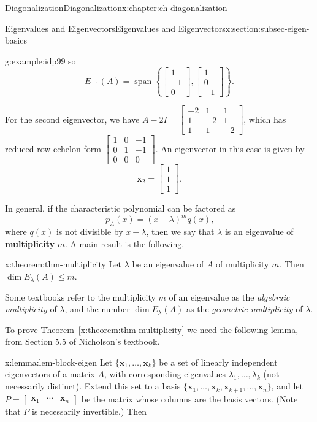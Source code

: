 \documentclass[oneside,10pt,]{book}
\newcommand{\xreffont}{\relax}
\newcommand{\terminology}[1]{\textbf{#1}}
\numberwithin{equation}{section}
\newcommand{\spn}{\operatorname{span}}
\newcommand{\bbm}{\begin{bmatrix}}
\newcommand{\ebm}{\end{bmatrix}}
\newcommand{\xx}{\mathbf{x}}
\newcommand{\amp}{&}
\begin{document}
\begin{chapterptx}{Diagonalization}{}{Diagonalization}{}{}{x:chapter:ch-diagonalization}
\begin{sectionptx}{Eigenvalues and Eigenvectors}{}{Eigenvalues and Eigenvectors}{}{}{x:section:subsec-eigen-basics}
\begin{example}{}{g:example:idp99}
so%
\begin{equation*}
E_{-1}(A) = \spn\left\{\bbm 1\\-1\\0\ebm, \bbm 1\\0\\-1\ebm\right\}\text{.}
\end{equation*}
%
\par
For the second eigenvector, we have \(A-2I = \bbm -2\amp 1\amp 1\\1\amp -2\amp 1\\1\amp 1\amp -2\ebm\), which has reduced row-echelon form \(\bbm 1\amp 0\amp -1\\0\amp 1\amp -1\\0\amp 0\amp 0\ebm\). An eigenvector in this case is given by%
\begin{equation*}
\xx_2 = \bbm 1\\1\\1\ebm\text{.}
\end{equation*}
%
\end{example}
In general, if the characteristic polynomial can be factored as%
\begin{equation*}
p_A(x)=(x-\lambda)^mq(x)\text{,}
\end{equation*}
where \(q(x)\) is not divisible by \(x-\lambda\), then we say that \(\lambda\) is an eigenvalue of \terminology{multiplicity} \(m\). A main result is the following.%
\begin{theorem}{}{}{x:theorem:thm-multiplicity}%
Let \(\lambda\) be an eigenvalue of \(A\) of multiplicity \(m\). Then \(\dim E_\lambda(A)\leq m\).%
\end{theorem}
Some textbooks refer to the multiplicity \(m\) of an eigenvalue as the \emph{algebraic multiplicity} of \(\lambda\), and the number \(\dim E_\lambda(A)\) as the \emph{geometric multiplicity} of \(\lambda\).%
\par
To prove \hyperref[x:theorem:thm-multiplicity]{Theorem~{\xreffont\ref{x:theorem:thm-multiplicity}}} we need the following lemma, from Section 5.5 of Nicholson's textbook.%
\begin{lemma}{}{}{x:lemma:lem-block-eigen}%
Let \(\{\xx_1,\ldots, \xx_k\}\) be a set of linearly independent eigenvectors of a matrix \(A\), with corresponding eigenvalues \(\lambda_1,\ldots, \lambda_k\) (not necessarily distinct). Extend this set to a basis \(\{\xx_1,\ldots, \xx_k,\xx_{k+1},\ldots, \xx_n\}\), and let \(P=\bbm \xx_1\amp \cdots \amp \xx_n\ebm\) be the matrix whose columns are the basis vectors. (Note that \(P\) is necessarily invertible.) Then%

\end{lemma}
\end{sectionptx}
\end{chapterptx}
\end{document}
